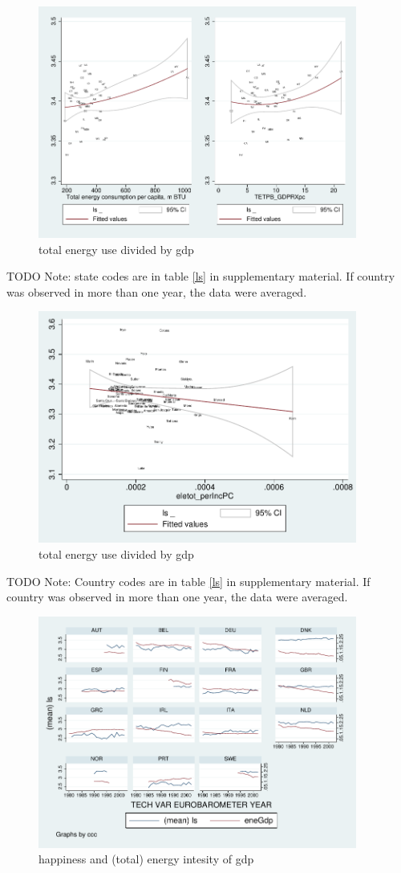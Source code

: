 \documentclass[10pt, letterpaper]{article}
\begin{document}
\begin{spacing}{1.4}
\begin{figure}[H]
 \includegraphics[height=3in]{graphsAndTables/lfTETPBgdpLS.pdf}\centering
\caption{total energy use divided by gdp}\label{}
\end{figure}
{\scriptsize TODO Note: state codes are in table \ref{ls} in supplementary
  material. If country was observed in more than one year, the data were averaged.}

\begin{figure}[H]
 \includegraphics[height=3in]{graphsAndTables/caEleTotGdp.pdf}\centering
\caption{total energy use divided by gdp}\label{}
\end{figure}
{\scriptsize TODO Note: Country codes are in table \ref{ls} in supplementary
  material. If country was observed in more than one year, the data were averaged.}

\begin{figure}[H]
 \includegraphics[height=3in]{graphsAndTables/ebTSeneGdp.pdf}\centering
\caption{happiness and (total) energy intesity of gdp}\label{ebTSeneGdp}
\end{figure}


\end{spacing}
\end{document}
